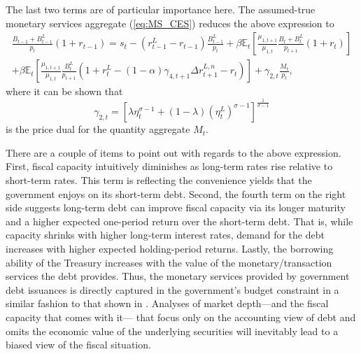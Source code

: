 \documentclass[11pt,a4paper,margin=1.5in]{article}
\begin{document}
The last two terms are of particular importance here.
The assumed-true monetary services aggregate (\ref{eq:MS_CES}) reduces the above expression to 
\begin{multline}
	\frac{B_{t-1} + B^L_{t-1}}{p_t}(1+r_{t-1})= s_t  - (r_{t-1}^L - r_{t-1})\frac{B^L_{t-1}}{p_t} + \beta\mathbb{E}_t\left[\frac{\mu_{1,t+1}}{\mu_{1,t}} \frac{B_{t} +B^L_{t}}{p_{t+1}}(1+r_{t})\right] \\ 
		+ \beta\mathbb{E}_t\left[\frac{\mu_{1,t+1}}{\mu_{1,t}} \frac{B^L_{t}}{p_{t+1}}(1+r^L_{t} - (1-\alpha)\gamma_{4,t+1}\Delta r^{L,n}_{t+1} - r_t)\right] 
		+  \gamma_{2,t}\frac{M_t}{p_t},
	\label{eq:fiscalcapacity}
\end{multline}
where it can be shown that
\begin{equation}
	\gamma_{2,t} = \left[\lambda \eta_t^{\sigma-1} + (1-\lambda)\left(\eta^L_t\right)^{\sigma-1}\right]^\frac{1}{\sigma-1}
	\label{eq:price_dual}
\end{equation}
is the price dual for the quantity aggregate $M_t$. 

There are a couple of items to point out with regards to the above expression.
First, fiscal capacity intuitively diminishes as long-term rates rise relative to short-term rates.
This term is reflecting the convenience yields that the government enjoys on its short-term debt.
Second, the fourth term on the right side suggests long-term debt can improve fiscal capacity via its longer maturity and a higher expected one-period return over the short-term debt. 
That is, while capacity shrinks with higher long-term interest rates, demand for the debt increases with higher expected holding-period returns. 
Lastly, the borrowing ability of the Treasury increases with the value of the monetary/transaction services the debt provides.
Thus, the monetary services provided by government debt issuances is directly captured in the government's budget constraint in a similar fashion to that shown in \citet{Brunnermeier-Merkel-Sannikov:2022}.
Analyses of market depth---and the fiscal capacity that comes with it--- that focus only on the accounting view of debt and omits the economic value of the underlying securities will inevitably lead to a biased view of the fiscal situation.
\end{document}
